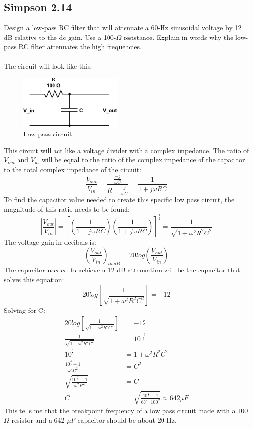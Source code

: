\documentclass[a4paper,12pt]{article}
\newcommand{\F}[2]{\ensuremath{\frac{#1}{#2}}}
\newcommand{\LP}{\left(}
\newcommand{\RP}{\right)}
\begin{document}
\subsection*{Simpson 2.14}
Design a low-pass RC filter that will attenuate a 60-Hz sinusoidal voltage by 12 dB relative to the dc gain.  Use a 100-$\Omega$ resistance. Explain in words why the low-pass RC filter attenuates the high frequencies.\\
\\
The circuit will look like this:
\begin{figure}[h]
\centering
\includegraphics[width=2in]{sam_lab2/simpson_low_pass.png}
\caption{Low-pass circuit.}
\end{figure}
This circuit will act like a voltage divider with a complex impedance.  The ratio of $V_{out}$ and $V_{in}$ will be equal to the ratio of the complex impedance of the capacitor to the total complex impedance of the circuit:
\[\F{V_{out}}{V_{in}}=\F{\F{-j}{\omega C}}{R-\F{j}{\omega C}}=\F{1}{1+j\omega RC}\]
To find the capacitor value needed to create this specific low pass circuit, the magnitude of this ratio needs to be found:
\[\left|\F{V_{out}}{V_{in}}\right|=\left[\LP\F{1}{1-j\omega RC}\RP\LP\F{1}{1+j\omega RC}\RP\right]^{\F{1}{2}}=\F{1}{\sqrt{1+\omega^2R^2C^2}}\]
The voltage gain in decibals is:
\[\LP\F{V_{out}}{V_{in}}\RP_{in~dB}=20log\LP\F{V_{out}}{V_{in}}\RP\]
The capacitor needed to achieve a 12 dB attenuation will be the capacitor that solves this equation:
\[20log\left[\F{1}{\sqrt{1+\omega^2R^2C^2}}\right]=-12\]
Solving for C:
\begin{align*}
20log\left[\F{1}{\sqrt{1+\omega^2R^2C^2}}\right]&=-12\\
\F{1}{\sqrt{1+\omega^2R^2C^2}}&=10^{\F{-3}{5}}\\
10^{\F{6}{5}}&=1+\omega^2R^2C^2\\
\F{10^{\F{6}{5}}-1}{\omega^2R^2}&=C^2\\
\sqrt{\F{10^{\F{6}{5}}-1}{\omega^2R^2}}&=C\\
C&=\sqrt{\F{10^{\F{6}{5}}-1}{60^2\cdot100^2}}\approx 642\mu F
\end{align*}
This tells me that the breakpoint frequency of a low pass circuit made with a 100 $\Omega$ resistor and a 642 $\mu F$ capacitor should be about 20 Hz.
\end{document}
